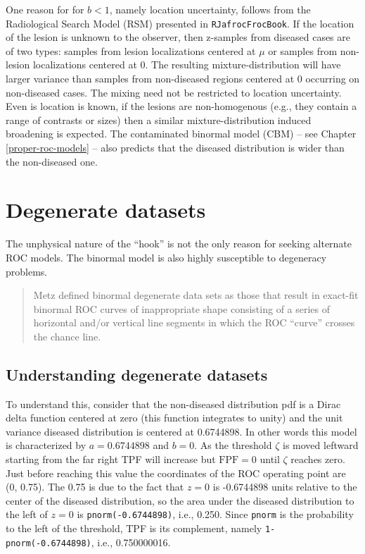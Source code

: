 \documentclass[
]{book}
\begin{document}
One reason for for \(b < 1\), namely location uncertainty, follows from the Radiological Search Model (RSM) presented in \texttt{RJafrocFrocBook}. If the location of the lesion is unknown to the observer, then z-samples from diseased cases are of two types: samples from lesion localizations centered at \(\mu\) or samples from non-lesion localizations centered at 0. The resulting mixture-distribution will have larger variance than samples from non-diseased regions centered at 0 occurring on non-diseased cases. The mixing need not be restricted to location uncertainty. Even is location is known, if the lesions are non-homogenous (e.g., they contain a range of contrasts or sizes) then a similar mixture-distribution induced broadening is expected. The contaminated binormal model (CBM) -- see Chapter \ref{proper-roc-models} -- also predicts that the diseased distribution is wider than the non-diseased one.

\hypertarget{binormal-model-degeneracy}{%
\section{Degenerate datasets}\label{binormal-model-degeneracy}}

The unphysical nature of the ``hook'' is not the only reason for seeking alternate ROC models. The binormal model is also highly susceptible to degeneracy problems.

\begin{quote}
Metz defined binormal degenerate data sets as those that result in exact-fit binormal ROC curves of inappropriate shape consisting of a series of horizontal and/or vertical line segments in which the ROC ``curve'' crosses the chance line.
\end{quote}

\hypertarget{binormal-model-understanding-degenerate-datasets}{%
\subsection{Understanding degenerate datasets}\label{binormal-model-understanding-degenerate-datasets}}

To understand this, consider that the non-diseased distribution pdf is a Dirac delta function centered at zero (this function integrates to unity) and the unit variance diseased distribution is centered at 0.6744898. In other words this model is characterized by \(a = 0.6744898\) and \(b = 0\). As the threshold \(\zeta\) is moved leftward starting from the far right TPF will increase but \(\text{FPF}=0\) until \(\zeta\) reaches zero. Just before reaching this value the coordinates of the ROC operating point are (0, 0.75). The 0.75 is due to the fact that \(z = 0\) is -0.6744898 units relative to the center of the diseased distribution, so the area under the diseased distribution to the left of \(z = 0\) is \texttt{pnorm(-0.6744898)}, i.e., 0.250. Since \texttt{pnorm} is the probability to the left of the threshold, TPF is its complement, namely \texttt{1-pnorm(-0.6744898)}, i.e., 0.750000016.
\end{document}
